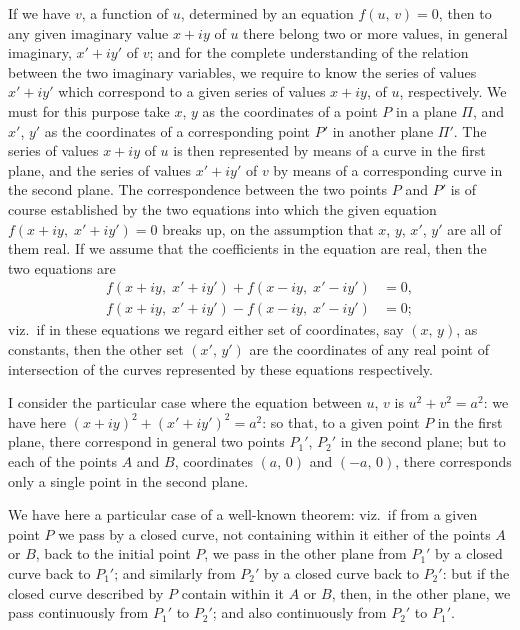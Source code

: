 \documentclass[11pt,a4paper]{book}
\begin{document}
\medskip
\noindent
If we have $v$, a function of $u$, determined by an equation $f(u,\,v) = 0$, then to any given imaginary value $x+iy$ of $u$ there belong two or more values, in general imaginary, $x'+iy'$ of $v$; and for the complete understanding of the relation between the two imaginary variables, we require to know the series of values $x'+iy'$ which correspond to a given series of values $x+iy$, of $u$, respectively. We must for this purpose take $x$, $y$ as the coordinates of a point $P$ in a plane $\Pi$, and $x'$, $y'$ as the coordinates of a corresponding point $P'$ in another plane $\Pi'$. The series of values $x+iy$ of $u$ is then represented by means of a curve in the first plane, and the series of values $x'+iy'$ of $v$ by means of a corresponding curve in the second plane. The correspondence between the two points $P$ and $P'$ is of course established by the two equations into which the given equation $f(x+iy,\; x'+iy') = 0$ breaks up, on the assumption that $x$, $y$, $x'$, $y'$ are all of them real. If we assume that the coefficients in the equation are real, then the two equations are
\begin{align*}
f(x+iy,\; x'+iy') + f(x-iy,\; x'-iy') &= 0, \\
f(x+iy,\; x'+iy') - f(x-iy,\; x'-iy') &= 0;
\end{align*}
viz.\ if in these equations we regard either set of coordinates, say $(x,\,y)$, as constants, then the other set $(x',\,y')$ are the coordinates of any real point of intersection of the curves represented by these equations respectively.

I consider the particular case where the equation between $u$, $v$ is $u^2 + v^2 = a^2$: we have here $(x+iy)^2 + (x'+iy')^2 = a^2$: so that, to a given point $P$ in the first plane, there correspond in general two points $P_1'$, $P_2'$ in the second plane; but to each of the points $A$ and $B$, coordinates $(a,\,0)$ and $(-a,\,0)$, there corresponds only a single point in the second plane.

We have here a particular case of a well-known theorem: viz.\ if from a given point $P$ we pass by a closed curve, not containing within it either of the points $A$ or $B$, back to the initial point $P$, we pass in the other plane from $P_1'$ by a closed curve back to $P_1'$; and similarly from $P_2'$ by a closed curve back to $P_2'$: but if the closed curve described by $P$ contain within it $A$ or $B$, then, in the other plane, we pass continuously from $P_1'$ to $P_2'$; and also continuously from $P_2'$ to $P_1'$.
\end{document}
